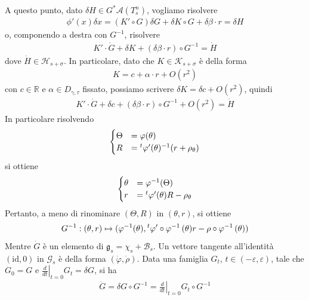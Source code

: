 \documentclass[twoside, 11pt]{amsbook}
\makeatletter
\newcommand{\0}{{(0)}}
\newcommand{\3}{{(3)}}
\theoremstyle{colonplain}
\theoremstyle{colondefinition}
\theoremstyle{colonremark}
\numberwithin{equation}{chapter}
\renewcommand{\proofname}{Dimostrazione}
\renewenvironment{proof}[1][\proofname]{\par
  \pushQED{\qed}%
  \normalfont \topsep6\p@\@plus6\p@\relax
  \trivlist
  \item[\hskip\labelsep\bfseries #1:]\ignorespaces
}{%
  \popQED\endtrivlist\@endpefalse
}
\makeatother
\begin{document}
\begin{proof}
A questo punto, dato $\delta H \in G^*\mathcal{A}(T^n_s)$, vogliamo risolvere
\begin{align}
    \phi'(x)\delta x = (K' \circ G)\delta G + \delta K \circ G + \delta\beta \cdot r = \delta H
\end{align}
o, componendo a destra con $G^{-1}$, risolvere
\begin{align}\label{LinEqDphi}
    K' \cdot \dot{G} + \delta K + (\delta\beta \cdot r) \circ G^{-1} = \dot{H}
\end{align}
dove $\dot{H} \in \mathcal{H}_{s + \sigma}$. In particolare, dato che $K \in \mathcal{K}_{s + \sigma}$ è della forma
\begin{align}
    K = c + \alpha \cdot r + O(r^2)
\end{align}
con $c \in \mathbb{R}$ e $\alpha \in D_{\gamma, \tau}$ fissato, possiamo scrivere $\delta K = \delta c + O(r^2)$, quindi
\begin{align}
    K' \cdot \dot{G} + \delta c + (\delta\beta \cdot r) \circ G^{-1} + O(r^2) = \dot{H}
\end{align}
In particolare risolvendo
\begin{align}
    \begin{cases}
        \Theta &= \varphi(\theta) \\
        R &= \null^t\varphi'(\theta)^{-1}(r + \rho_\theta)
    \end{cases}
\end{align}
si ottiene
\begin{align}
    \begin{cases}
        \theta &= \varphi^{-1}(\Theta) \\
        r &= \null^t\varphi'(\theta)R - \rho_\theta
    \end{cases}
\end{align}
Pertanto, a meno di rinominare $(\Theta, R)$ in $(\theta, r)$, si ottiene
\begin{align}
    G^{-1} : (\theta, r) \mapsto (\varphi^{-1}(\theta), \null^t\varphi' \circ \varphi^{-1} \, (\theta)r - \rho \circ \varphi^{-1} \, (\theta))
\end{align}
Mentre $\dot{G}$ è un elemento di $\mathfrak{g}_s = \chi_s + \mathcal{B}_s$. Un vettore tangente all'identità $(\mathrm{id}, 0)$ in $\mathcal{G}_s$ è della forma $(\dot{\varphi}, \dot{\rho})$. Data una famiglia $G_t$, $t \in (-\varepsilon, \varepsilon)$, tale che $G_0 = G$ e $\left.\frac{d}{dt}\right|_{t = 0} G_t = \delta G$, si ha
\begin{align}
    \dot{G} = \delta G \circ G^{-1} = \left.\frac{d}{dt}\right|_{t = 0} G_t \circ G^{-1}

\end{align}
\end{proof}
\end{document}
